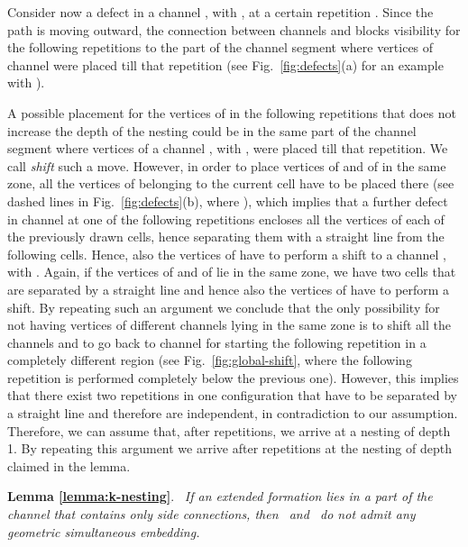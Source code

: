 \documentclass[a4paper,10pt]{llncs}
\renewenvironment{proof}
{{\bf Proof:}}{\hspace*{\fill}\par\vspace{2mm}}
\newcommand{\rephrase}[3]{\noindent\textbf{#1 #2}.~\emph{#3}}
\newcommand{\T}{\mbox{ }}
\renewcommand{\P}{\mbox{ }}
\begin{document}
\begin{proof}
Consider now a defect in a channel , with , at a certain repetition . Since the path is moving outward, the connection between channels  and  blocks visibility for the following repetitions to the part of the channel segment where vertices of channel  were placed till that repetition (see Fig.~\ref{fig:defects}(a) for an example with ).

A possible placement for the vertices of  in the following repetitions that does not increase the depth of the nesting could be in the same part of the channel segment where vertices of a channel , with , were placed till that repetition. We call \emph{shift} such a move. However, in order to place vertices of  and of  in the same zone, all the vertices of  belonging to the current cell have to be placed there (see dashed lines in Fig.~\ref{fig:defects}(b), where ), which implies that a further defect in channel  at one of the following repetitions encloses all the vertices of each of the previously drawn cells, hence separating them with a straight line from the following cells. Hence, also the vertices of  have to perform a shift to a channel , with . Again, if the vertices of  and of  lie in the same zone, we have two cells that are separated by a straight line and hence also the vertices of  have to perform a shift. By repeating such an argument we conclude that the only possibility for not having vertices of different channels lying in the same zone is to shift all the channels  and to go back to channel  for starting the following repetition in a completely different region (see Fig.~\ref{fig:global-shift}, where the following repetition is performed completely below the previous one). However, this implies that there exist two repetitions in one configuration that have to be separated by a straight line and therefore are independent, in contradiction to our assumption.
Therefore, we can assume that, after  repetitions, we arrive at a nesting of depth 1. By repeating this argument we arrive after  repetitions at the nesting of depth  claimed in the lemma.
\end{proof}

\rephrase{Lemma}{\ref{lemma:k-nesting}}{
If an extended formation lies in a part of the channel that contains only side connections, then \T and \P do not admit any geometric simultaneous embedding.
}
\end{document}
